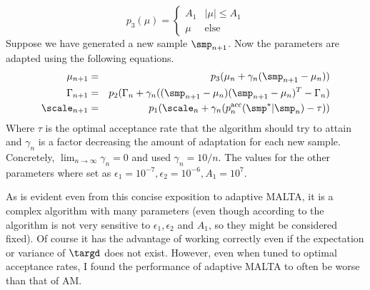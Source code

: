 \begin{equation*}
p_3(\mu) = \begin{cases}A_1 &|\mu| \leq A_1 \\ 
 \mu &\textrm{else}
 \end{cases}
 \end{equation*}
 Suppose we have generated a new sample $\smp_{n+1}$. Now the parameters are adapted using the following equations.
\begin{eqnarray*}
\mu_{n+1} &= &p_3(\mu_n+\gamma_n(\smp_{n+1} -\mu_n))\\
\Gamma_{n+1} &=& p_2(\Gamma_n + \gamma_n((\smp_{n+1}-\mu_n)(\smp_{n+1}-\mu_n)^T-\Gamma_n)\\
\scale_{n+1} &= &p_1(\scale_n+\gamma_n(p_n^\textrm{acc}(\smp^*|\smp_n)-\tau))
\end{eqnarray*}
Where $\tau$ is the optimal acceptance rate that the algorithm should try to attain and $\gamma_n$ is a factor decreasing the amount of adaptation for each new sample. Concretely,  $\lim_{n \rightarrow \infty}\gamma_n = 0$ and \cite{Atchade2006} used $\gamma_n = 10/n$. The values for the other parameters where set as $\epsilon_1 = 10^{-7}, \epsilon_2 = 10^{-6}, A_1=10^7$. 

As is evident even from this concise exposition to adaptive MALTA, it is a complex algorithm with many parameters (even though according to \cite{Atchade2006} the algorithm is not very sensitive to $\epsilon_1,\epsilon_2$ and $A_1$, so they might be considered fixed). Of course it has the advantage of working correctly even if the expectation or variance of $\targd$ does not exist. However, even when tuned to optimal acceptance rates, I found the performance of adaptive MALTA to often be worse than that of AM.


